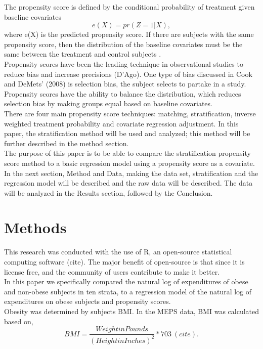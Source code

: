 \documentclass[11pt,twocolumn]{article}
\begin{document}
\indent The propensity score is defined by the conditional probability of treatment given baseline covariates
\begin{equation}
e(X)=pr(Z=1|X),
\end{equation}
where e(X) is the predicted propensity score. If there are subjects with the same propensity score, then the distribution of the baseline covariates must be the same between the treatment and control subjects \citep{austin2011introduction}.\\
\indent Propensity scores have been the leading technique in observational studies to reduce bias and increase precisions (D'Ago). One type of bias discussed in Cook and DeMets’ (2008) is selection bias, the subject selects to partake in a study. Propensity scores have the ability to balance the distribution, which reduces selection bias by making groups equal based on baseline covariates.\\
\indent There are four main propensity score techniques: matching, stratification, inverse weighted treatment probability and covariate regression adjustment. In this paper, the stratification method will be used and analyzed; this method will be further described in the method section.\\
\indent The purpose of this paper is to be able to compare the stratification propensity score method to a basic regression model using a propensity score as a covariate. In the next section, Method and Data, making the data set, stratification and the regression model will be described and the raw data will be described. The data will be analyzed in the Results section, followed by the Conclusion.
 
 
 
\section{Methods}
This research was conducted with the use of R, an open-source statistical computing software (cite). The major benefit of open-source is that since it is license free, and the community of users contribute to make it better. \\
\indent In this paper we specifically compared the natural log of expenditures of obese and non-obese subjects in ten strata, to a regression model of the natural log of expenditures on obese subjects and propensity scores.\\
\indent Obesity was determined by subjects BMI. In the MEPS data, BMI was calculated based on,
\begin{equation}
BMI = \frac{Weight in Pounds} {(Height in Inches)^2 } * 703 ~(cite).
\end{equation}
 
\end{document}

